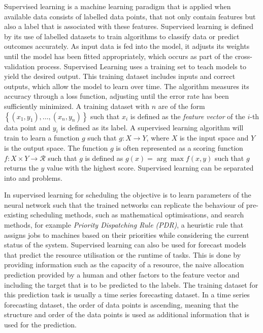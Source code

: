         Supervised learning is a machine learning paradigm that is applied when available data consists of labelled data points, that not only contain features but also a label that is associated with these features.
        Supervised learning is defined by its use of labelled datasets to train algorithms to classify data or predict outcomes accurately.
        As input data is fed into the model, it adjusts its weights until the model has been fitted appropriately, which occurs as part of the cross-validation process.
        Supervised Learning uses a training set to teach models to yield the desired output.  
        This training dataset includes inputs and correct outputs, which allow the model to learn over time. The algorithm measures its accuracy through a loss function, adjusting until the error rate has been sufficiently minimized.
        A training dataset with $n$ are of the form $\left\{(x_1, y_1), \dots , (x_n, y_n)\right\}$ such that $x_i$ is defined as the \emph{feature vector} of the $i$-th data point and $y_i$ is defined as its label.
        A supervised learning algorithm will train to learn a function $g$ such that $g: X \rightarrow Y$, where $X$ is the input space and $Y$ is the output space.
        The function $g$ is often represented as a scoring function $f: X \times Y \rightarrow \mathcal{R}$ such that $g$ is defined as $g(x) = \arg \max f(x, y)$ such that $g$ returns the $y$ value with the highest score.
        Supervised learning can be separated into  and  problems.

        In supervised learning for scheduling the objective is to learn parameters of the neural network such that the trained networks can replicate the behaviour of pre-existing scheduling methods, such as mathematical optimisations, and search methods, for example \emph{Priority Dispatching Rule (PDR)}, a heuristic rule that assigns jobs to machines based on their priorities while considering the current status of the system.
        Supervised learning can also be used for forecast models that predict the resource utilisation or the runtime of tasks.
        This is done by providing information such as the capacity of a resource, the naive allocation prediction provided by a human and other factors to the feature vector and including the target that is to be predicted to the labels. 
        The training dataset for this prediction task is usually a time series forecasting dataset.
        In a time series forecasting dataset, the order of data points is ascending, meaning that the structure and order of the data points is used as additional information that is used for the prediction.

